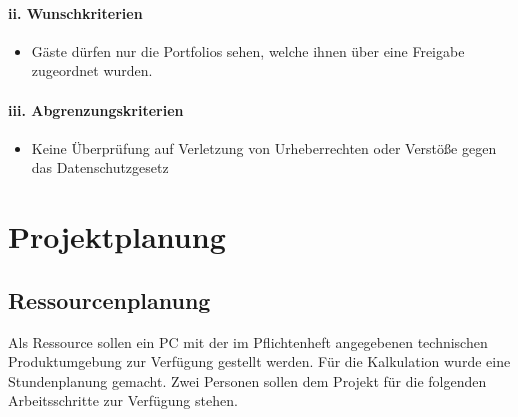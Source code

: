 \documentclass[10.5pt]{scrarticle}
\begin{document}
\paragraph{ii. Wunschkriterien}

\begin{itemize}
\item Gäste dürfen nur die Portfolios sehen, welche ihnen über eine Freigabe zugeordnet wurden.
\end{itemize}

\paragraph{iii. Abgrenzungskriterien}

\begin{itemize}
\item Keine Überprüfung auf Verletzung von Urheberrechten oder Verstö{\ss}e gegen das    Datenschutzgesetz
\end{itemize}


\section{Projektplanung}
\subsection{Ressourcenplanung}
Als Ressource sollen ein PC mit der im Pflichtenheft angegebenen technischen Produktumgebung zur Verfügung gestellt werden. Für die Kalkulation wurde eine Stundenplanung gemacht. Zwei Personen sollen dem Projekt für die folgenden Arbeitsschritte zur Verfügung stehen.
\end{document}
